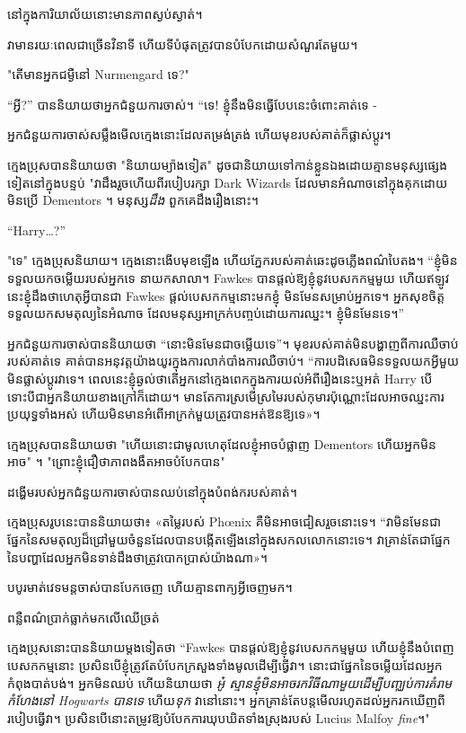 {{នៅក្នុងការិយាល័យនោះមានភាពស្ងប់ស្ងាត់។

វា​មាន​រយៈពេល​ជាច្រើន​វិនាទី ហើយ​ទីបំផុត​ត្រូវបាន​បំបែក​ដោយ​សំណួរ​តែមួយ។

"តើមានអ្នកជម្ងឺនៅ Nurmengard ទេ?"

“អ្វី?” បាននិយាយថាអ្នកជំនួយការចាស់។ “ទេ! ខ្ញុំនឹងមិនធ្វើបែបនេះចំពោះគាត់ទេ -

\later

អ្នកជំនួយការចាស់សម្លឹងមើលក្មេងនោះដែលតម្រង់ត្រង់ ហើយមុខរបស់គាត់ក៏ផ្លាស់ប្តូរ។

ក្មេងប្រុសបាននិយាយថា "និយាយម្យ៉ាងទៀត" ដូចជានិយាយទៅកាន់ខ្លួនឯងដោយគ្មានមនុស្សផ្សេងទៀតនៅក្នុងបន្ទប់ "វាដឹងរួចហើយពីរបៀបរក្សា Dark Wizards ដែលមានអំណាចនៅក្នុងគុកដោយមិនប្រើ Dementors ។ មនុស្ស\emph{ដឹង} ពួកគេដឹងរឿងនោះ។

“Harry…?”

"ទេ" ក្មេងប្រុសនិយាយ។ ក្មេង​នោះ​ងើប​មុខ​ឡើង ហើយ​ភ្នែក​របស់​គាត់​ឆេះ​ដូច​ភ្លើង​ពណ៌​បៃតង។ “ខ្ញុំមិនទទួលយកចម្លើយរបស់អ្នកទេ នាយកសាលា។ Fawkes បានផ្តល់ឱ្យខ្ញុំនូវបេសកកម្មមួយ ហើយឥឡូវនេះខ្ញុំដឹងថាហេតុអ្វីបានជា Fawkes ផ្តល់បេសកកម្មនោះមកខ្ញុំ មិនមែនសម្រាប់អ្នកទេ។ អ្នកសុខចិត្តទទួលយកសមតុល្យនៃអំណាច ដែលមនុស្សអាក្រក់បញ្ចប់ដោយការឈ្នះ។ ខ្ញុំមិនមែនទេ។”

អ្នកជំនួយការចាស់បាននិយាយថា “នោះមិនមែនជាចម្លើយទេ”។ មុខរបស់គាត់មិនបង្ហាញពីការឈឺចាប់របស់គាត់ទេ គាត់បានអនុវត្តយ៉ាងយូរក្នុងការលាក់បាំងការឈឺចាប់។ “ការបដិសេធមិនទទួលយកអ្វីមួយ មិនផ្លាស់ប្តូរវាទេ។ ពេលនេះខ្ញុំឆ្ងល់ថាតើអ្នកនៅក្មេងពេកក្នុងការយល់អំពីរឿងនេះឬអត់ Harry បើទោះបីជាអ្នកនិយាយខាងក្រៅក៏ដោយ។ មានតែការស្រមើស្រមៃរបស់កុមារប៉ុណ្ណោះដែលអាចឈ្នះការប្រយុទ្ធទាំងអស់ ហើយមិនមានអំពើអាក្រក់មួយត្រូវបានអត់ឱនឱ្យទេ»។

ក្មេងប្រុសបាននិយាយថា "ហើយនោះជាមូលហេតុដែលខ្ញុំអាចបំផ្លាញ Dementors ហើយអ្នកមិនអាច" ។ "ព្រោះខ្ញុំជឿថាភាពងងឹតអាចបំបែកបាន"

ដង្ហើមរបស់អ្នកជំនួយការចាស់បានឈប់នៅក្នុងបំពង់ករបស់គាត់។

ក្មេង​ប្រុស​រូប​នេះ​បាន​និយាយ​ថា​៖ «​តម្លៃ​របស់ Phœnix គឺ​មិន​អាច​ជៀស​រួច​នោះ​ទេ។ “វាមិនមែនជាផ្នែកនៃសមតុល្យដ៏ជ្រៅមួយចំនួនដែលបានបង្កើតឡើងនៅក្នុងសកលលោកនោះទេ។ វា​គ្រាន់​តែ​ជា​ផ្នែក​នៃ​បញ្ហា​ដែល​អ្នក​មិន​ទាន់​ដឹង​ថា​ត្រូវ​បោក​ប្រាស់​យ៉ាង​ណា​»។

បបូរ​មាត់​វេទមន្ត​ចាស់​បាន​បែក​ចេញ ហើយ​គ្មាន​ពាក្យ​អ្វី​ចេញ​មក។

ពន្លឺ​ពណ៌​ប្រាក់​ធ្លាក់​មក​លើ​ឈើ​ច្រត់

ក្មេងប្រុសនោះបាននិយាយម្តងទៀតថា “Fawkes បានផ្តល់ឱ្យខ្ញុំនូវបេសកកម្មមួយ ហើយខ្ញុំនឹងបំពេញបេសកកម្មនោះ ប្រសិនបើខ្ញុំត្រូវតែបំបែកក្រសួងទាំងមូលដើម្បីធ្វើវា។ នោះ​ជា​ផ្នែក​នៃ​ចម្លើយ​ដែល​អ្នក​កំពុង​បាត់​បង់។ អ្នកមិនឈប់ ហើយនិយាយថា \emph{អូ៎ ស្មានខ្ញុំមិនអាចរកវិធីណាមួយដើម្បីបញ្ឈប់ការគំរាមកំហែងនៅ Hogwarts បានទេ} ហើយ\emph{ទុក} វានៅនោះ។ អ្នក​គ្រាន់​តែ​បន្ត​មើល​រហូត​ដល់​អ្នក​រក​ឃើញ​ពី​របៀប​ធ្វើ​វា។ ប្រសិនបើនោះតម្រូវឱ្យបំបែកការឃុបឃិតទាំងស្រុងរបស់ Lucius Malfoy \emph{fine}។"

}}
